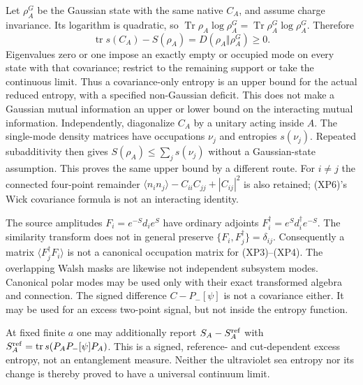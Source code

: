 \documentclass[11pt]{article}
\DeclareMathOperator{\Tr}{Tr}
\DeclareMathOperator{\tr}{tr}
\begin{document}
Let $\rho_A^G$ be the Gaussian state with the same native
$C_A$, and assume charge invariance.  Its logarithm is quadratic,
so $\Tr\rho_A\log\rho_A^G=\Tr\rho_A^G\log\rho_A^G$.  Therefore
\begin{equation}
 \tr s(C_A)-S(\rho_A)
       =D(\rho_A\Vert\rho_A^G)\geq0 .
 \tag{XP10}
\end{equation}
Eigenvalues zero or one impose an exactly empty or occupied mode
on every state with that covariance; restrict to the remaining
support or take the continuous limit.  Thus a covariance-only
entropy is an upper bound for the actual reduced entropy,
with a specified non-Gaussian deficit.  This does not make a
Gaussian mutual information an upper or lower bound on the
interacting mutual information.
Independently, diagonalize $C_A$ by a unitary acting inside $A$.
The single-mode density matrices have occupations $\nu_j$ and
entropies $s(\nu_j)$.  Repeated subadditivity then gives
$S(\rho_A)\leq\sum_j s(\nu_j)$ without a Gaussian-state assumption.
This proves the same upper bound by a different route.
For $i\ne j$ the connected four-point remainder
$\langle n_i n_j\rangle-C_{ii}C_{jj}+|C_{ij}|^2$
is also retained; (XP6)'s Wick covariance formula is not
an interacting identity.

The source amplitudes $F_i=e^{-S}d_i e^S$ have ordinary adjoints
$F_i^\dagger=e^S d_i^\dagger e^{-S}$.
The similarity transform does not in general preserve
$\{F_i,F_j^\dagger\}=\delta_{ij}$.
Consequently a matrix $\langle F_j^\dagger F_i\rangle$ is not
a canonical occupation matrix for (XP3)--(XP4).
The overlapping Walsh masks are likewise not independent
subsystem modes.  Canonical polar modes may be used only
with their exact transformed algebra and connection.
The signed difference $C-P_-[\psi]$ is not a covariance either.
It may be used for an excess two-point signal, but not inside
the entropy function.

At fixed finite $a$ one may additionally report
$S_A-S_A^{\rm ref}$ with
$S_A^{\rm ref}=\tr s(P_A P_-[\psi]P_A)$.
This is a signed, reference- and cut-dependent excess entropy,
not an entanglement measure.  Neither the ultraviolet sea
entropy nor its change is thereby proved to have a universal
continuum limit.
\end{document}
